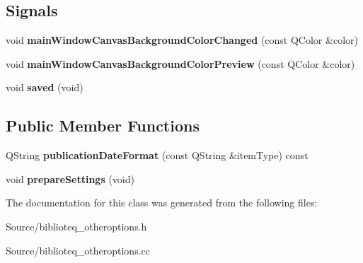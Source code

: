 \subsection*{Signals}
\begin{DoxyCompactItemize}
\item 
void {\bfseries main\+Window\+Canvas\+Background\+Color\+Changed} (const Q\+Color \&color)\hypertarget{classbiblioteq__otheroptions_ad1fd8fdb291f0ca0221e537d4c5c162c}{}\label{classbiblioteq__otheroptions_ad1fd8fdb291f0ca0221e537d4c5c162c}

\item 
void {\bfseries main\+Window\+Canvas\+Background\+Color\+Preview} (const Q\+Color \&color)\hypertarget{classbiblioteq__otheroptions_aceacb0ae2efa098374082c613d7189b6}{}\label{classbiblioteq__otheroptions_aceacb0ae2efa098374082c613d7189b6}

\item 
void {\bfseries saved} (void)\hypertarget{classbiblioteq__otheroptions_a0bf438e6c64426e26d45d8727c5e1732}{}\label{classbiblioteq__otheroptions_a0bf438e6c64426e26d45d8727c5e1732}

\end{DoxyCompactItemize}
\subsection*{Public Member Functions}
\begin{DoxyCompactItemize}
\item 
Q\+String {\bfseries publication\+Date\+Format} (const Q\+String \&item\+Type) const \hypertarget{classbiblioteq__otheroptions_a1ce7cd5dbef600042498209fe3f77165}{}\label{classbiblioteq__otheroptions_a1ce7cd5dbef600042498209fe3f77165}

\item 
void {\bfseries prepare\+Settings} (void)\hypertarget{classbiblioteq__otheroptions_aa4df15758034cbbc81cae797f6a606b2}{}\label{classbiblioteq__otheroptions_aa4df15758034cbbc81cae797f6a606b2}

\end{DoxyCompactItemize}


The documentation for this class was generated from the following files\+:\begin{DoxyCompactItemize}
\item 
Source/biblioteq\+\_\+otheroptions.\+h\item 
Source/biblioteq\+\_\+otheroptions.\+cc\end{DoxyCompactItemize}
